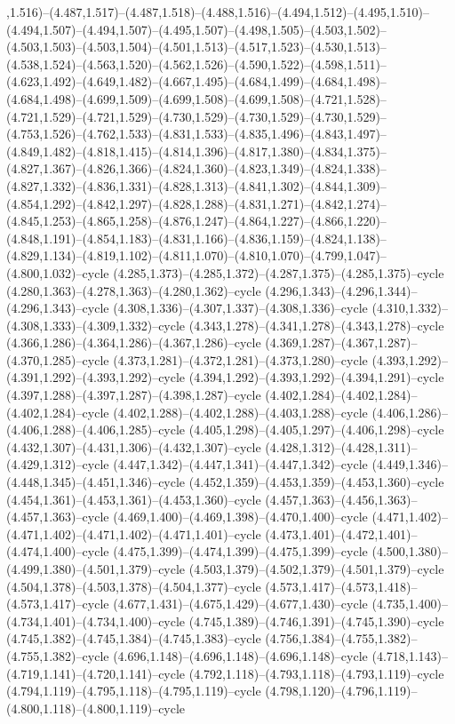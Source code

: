 ,1.516)--(4.487,1.517)--(4.487,1.518)--(4.488,1.516)--(4.494,1.512)--(4.495,1.510)--(4.494,1.507)--(4.494,1.507)--(4.495,1.507)--(4.498,1.505)--(4.503,1.502)--(4.503,1.503)--(4.503,1.504)--(4.501,1.513)--(4.517,1.523)--(4.530,1.513)--(4.538,1.524)--(4.563,1.520)--(4.562,1.526)--(4.590,1.522)--(4.598,1.511)--(4.623,1.492)--(4.649,1.482)--(4.667,1.495)--(4.684,1.499)--(4.684,1.498)--(4.684,1.498)--(4.699,1.509)--(4.699,1.508)--(4.699,1.508)--(4.721,1.528)--(4.721,1.529)--(4.721,1.529)--(4.730,1.529)--(4.730,1.529)--(4.730,1.529)--(4.753,1.526)--(4.762,1.533)--(4.831,1.533)--(4.835,1.496)--(4.843,1.497)--(4.849,1.482)--(4.818,1.415)--(4.814,1.396)--(4.817,1.380)--(4.834,1.375)--(4.827,1.367)--(4.826,1.366)--(4.824,1.360)--(4.823,1.349)--(4.824,1.338)--(4.827,1.332)--(4.836,1.331)--(4.828,1.313)--(4.841,1.302)--(4.844,1.309)--(4.854,1.292)--(4.842,1.297)--(4.828,1.288)--(4.831,1.271)--(4.842,1.274)--(4.845,1.253)--(4.865,1.258)--(4.876,1.247)--(4.864,1.227)--(4.866,1.220)--(4.848,1.191)--(4.854,1.183)--(4.831,1.166)--(4.836,1.159)--(4.824,1.138)--(4.829,1.134)--(4.819,1.102)--(4.811,1.070)--(4.810,1.070)--(4.799,1.047)--(4.800,1.032)--cycle (4.285,1.373)--(4.285,1.372)--(4.287,1.375)--(4.285,1.375)--cycle (4.280,1.363)--(4.278,1.363)--(4.280,1.362)--cycle (4.296,1.343)--(4.296,1.344)--(4.296,1.343)--cycle (4.308,1.336)--(4.307,1.337)--(4.308,1.336)--cycle (4.310,1.332)--(4.308,1.333)--(4.309,1.332)--cycle (4.343,1.278)--(4.341,1.278)--(4.343,1.278)--cycle (4.366,1.286)--(4.364,1.286)--(4.367,1.286)--cycle (4.369,1.287)--(4.367,1.287)--(4.370,1.285)--cycle (4.373,1.281)--(4.372,1.281)--(4.373,1.280)--cycle (4.393,1.292)--(4.391,1.292)--(4.393,1.292)--cycle (4.394,1.292)--(4.393,1.292)--(4.394,1.291)--cycle (4.397,1.288)--(4.397,1.287)--(4.398,1.287)--cycle (4.402,1.284)--(4.402,1.284)--(4.402,1.284)--cycle (4.402,1.288)--(4.402,1.288)--(4.403,1.288)--cycle (4.406,1.286)--(4.406,1.288)--(4.406,1.285)--cycle (4.405,1.298)--(4.405,1.297)--(4.406,1.298)--cycle (4.432,1.307)--(4.431,1.306)--(4.432,1.307)--cycle (4.428,1.312)--(4.428,1.311)--(4.429,1.312)--cycle (4.447,1.342)--(4.447,1.341)--(4.447,1.342)--cycle (4.449,1.346)--(4.448,1.345)--(4.451,1.346)--cycle (4.452,1.359)--(4.453,1.359)--(4.453,1.360)--cycle (4.454,1.361)--(4.453,1.361)--(4.453,1.360)--cycle (4.457,1.363)--(4.456,1.363)--(4.457,1.363)--cycle (4.469,1.400)--(4.469,1.398)--(4.470,1.400)--cycle (4.471,1.402)--(4.471,1.402)--(4.471,1.402)--(4.471,1.401)--cycle (4.473,1.401)--(4.472,1.401)--(4.474,1.400)--cycle (4.475,1.399)--(4.474,1.399)--(4.475,1.399)--cycle (4.500,1.380)--(4.499,1.380)--(4.501,1.379)--cycle (4.503,1.379)--(4.502,1.379)--(4.501,1.379)--cycle (4.504,1.378)--(4.503,1.378)--(4.504,1.377)--cycle (4.573,1.417)--(4.573,1.418)--(4.573,1.417)--cycle (4.677,1.431)--(4.675,1.429)--(4.677,1.430)--cycle (4.735,1.400)--(4.734,1.401)--(4.734,1.400)--cycle (4.745,1.389)--(4.746,1.391)--(4.745,1.390)--cycle (4.745,1.382)--(4.745,1.384)--(4.745,1.383)--cycle (4.756,1.384)--(4.755,1.382)--(4.755,1.382)--cycle (4.696,1.148)--(4.696,1.148)--(4.696,1.148)--cycle (4.718,1.143)--(4.719,1.141)--(4.720,1.141)--cycle (4.792,1.118)--(4.793,1.118)--(4.793,1.119)--cycle (4.794,1.119)--(4.795,1.118)--(4.795,1.119)--cycle (4.798,1.120)--(4.796,1.119)--(4.800,1.118)--(4.800,1.119)--cycle 